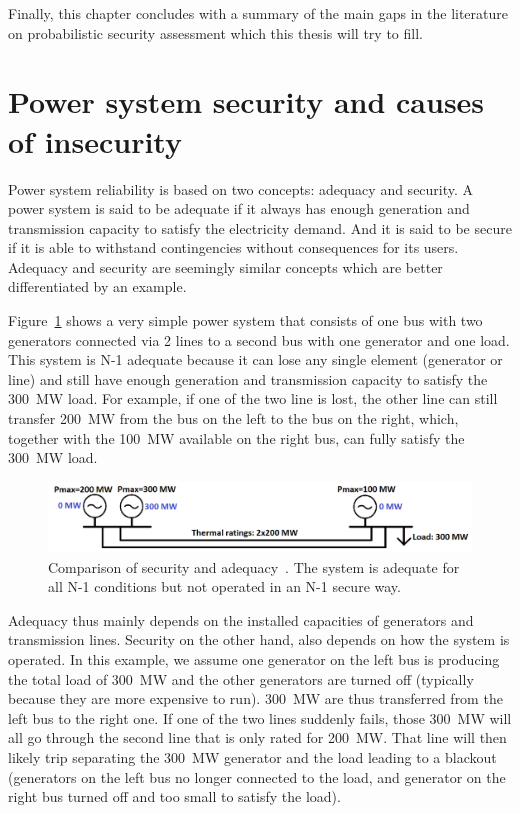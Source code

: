 Finally, this chapter concludes with a summary of the main gaps in the literature on probabilistic security assessment which this thesis will try to fill.



\section{Power system security and causes of insecurity}
\label{sec:Security_and_threats}

Power system reliability is based on two concepts: adequacy and security. A power system is said to be adequate if it always has enough generation and transmission capacity to satisfy the electricity demand. And it is said to be secure if it is able to withstand contingencies without consequences for its users. Adequacy and security are seemingly similar concepts which are better differentiated by an example.

Figure~\ref{fig:security_vs_adequacy} shows a very simple power system that consists of one bus with two generators connected via 2 lines to a second bus with one generator and one load. This system is N-1 adequate because it can lose any single element (generator or line) and still have enough generation and transmission capacity to satisfy the 300~MW load. For example, if one of the two line is lost, the other line can still transfer 200~MW from the bus on the left to the bus on the right, which, together with the 100~MW available on the right bus, can fully satisfy the 300~MW load.

\begin{figure}[h]
    \centering
    \includegraphics[width=\linewidth]{Figs/Security_vs_adequacy.png}
    \caption{Comparison of security and adequacy~\cite{adequacy_vs_security}. The system is adequate for all N-1 conditions but not operated in an N-1 secure way.}
    \label{fig:security_vs_adequacy}
\end{figure}

Adequacy thus mainly depends on the installed capacities of generators and transmission lines. Security on the other hand, also depends on how the system is operated. In this example, we assume one generator on the left bus is producing the total load of 300~MW and the other generators are turned off (typically because they are more expensive to run). 300~MW are thus transferred from the left bus to the right one. If one of the two lines suddenly fails, those 300~MW will all go through the second line that is only rated for 200~MW. That line will then likely trip separating the 300~MW generator and the load leading to a blackout (generators on the left bus no longer connected to the load, and generator on the right bus turned off and too small to satisfy the load).

